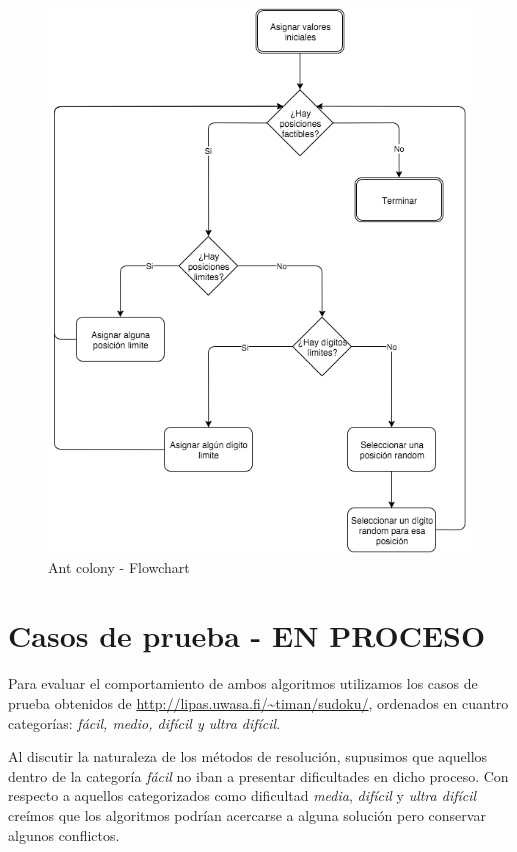 \documentclass[a4paper,spanish]{article}
\begin{document}
\begin{figure}[h]
	\centering
	\includegraphics[scale=0.55]{./img/ant_workflow.png}
	\caption{Ant colony - Flowchart}
	\label{img:ants_flowchart}
\end{figure}

\clearpage

\section{Casos de prueba - EN PROCESO}

Para evaluar el comportamiento de ambos algoritmos utilizamos los casos de prueba obtenidos de
\url{http://lipas.uwasa.fi/~timan/sudoku/}, ordenados en cuantro categorías: \textit{fácil, medio, difícil y ultra difícil}.

Al discutir la naturaleza de los métodos de resolución, supusimos que aquellos dentro de la
categoría \emph{fácil} no iban a presentar dificultades en dicho proceso. Con respecto a aquellos
categorizados como dificultad \emph{media}, \emph{difícil} y \emph{ultra difícil} creímos que los algoritmos podrían
acercarse a alguna solución pero conservar algunos conflictos.
\end{document}
